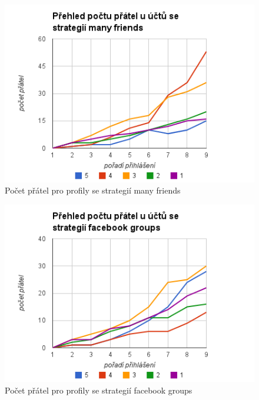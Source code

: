 \documentclass[thesis=M,czech]{FITthesis}[2013/05/10]
\begin{document}
\begin{figure}[h]
\includegraphics[width=5in]{figures/levelMany.png}
\caption{Počet přátel pro profily se strategií many friends}
\label{fig:levelMany}
\end{figure}

\begin{figure}[h]
\includegraphics[width=5in]{figures/levelGroup.png}
\caption{Počet přátel pro profily se strategií facebook groups}
\label{fig:levelGroup}
\end{figure}
\end{document}

